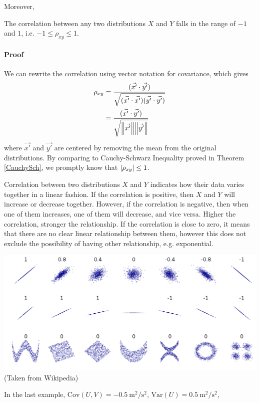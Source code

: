 Moreover,
\begin{defn}
The correlation between any two distributions $X$ and $Y$ falls in the range of $-1$ and $1$, i.e. $-1 \leq \rho_{xy} \leq 1$.
\paragraph{Proof} We can rewrite the correlation using vector notation for covariance, which gives
\begin{align*}
\rho_{xy} &= \frac{(\vec{x'} \cdot \vec{y'})}{\sqrt{(\vec{x'}\cdot\vec{x'})(\vec{y'}\cdot\vec{y'})}} \\
&= \frac{(\vec{x'} \cdot \vec{y'})}{\sqrt{{\norm{\vec{x'}}}\norm{\vec{y'}}}}
\end{align*}
where $\vec{x'}$ and $\vec{y'}$ are centered by removing the mean from the original distributions. By comparing to Cauchy-Schwarz Inequality proved in Theorem \ref{CauchySch}, we promptly know that $\abs{\rho_{xy}} \leq 1$.
\end{defn}
Correlation between two distributions $X$ and $Y$ indicates how their data varies together in a linear fashion. If the correlation is positive, then $X$ and $Y$ will increase or decrease together. However, if the correlation is negative, then when one of them increases, one of them will decrease, and vice versa. Higher the correlation, stronger the relationship. If the correlation is close to zero, it means that there are no clear linear relationship between them, however this does not exclude the possibility of having other relationship, e.g. exponential.
\begin{center}
\includegraphics[scale = 0.3]{1200px-Correlation_examples2.svg.png}\\
(Taken from Wikipedia)
\end{center}
In the last example, $\text{Cov}(U,V) = \SI{-0.5}{\square\m \per \square\s}$, $\text{Var}(U) = \SI{0.5}{\square\m \per \square\s}$,\\
